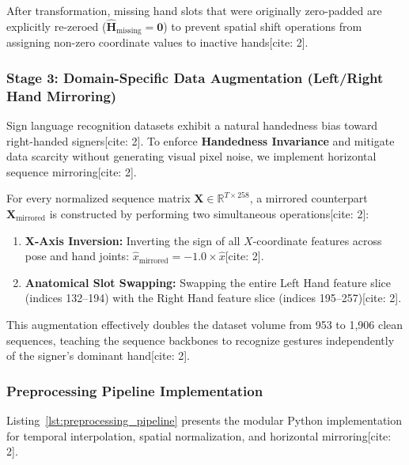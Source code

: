 \documentclass[12pt,a4paper]{article}
\begin{document}
After transformation, missing hand slots that were originally zero-padded are explicitly re-zeroed ($\hat{\mathbf{H}}_{\text{missing}} = \mathbf{0}$) to prevent spatial shift operations from assigning non-zero coordinate values to inactive hands[cite: 2].

\subsubsection{Stage 3: Domain-Specific Data Augmentation (Left/Right Hand Mirroring)}

Sign language recognition datasets exhibit a natural handedness bias toward right-handed signers[cite: 2]. To enforce \textbf{Handedness Invariance} and mitigate data scarcity without generating visual pixel noise, we implement horizontal sequence mirroring[cite: 2].

For every normalized sequence matrix $\mathbf{X} \in \mathbb{R}^{T \times 258}$, a mirrored counterpart $\mathbf{X}_{\text{mirrored}}$ is constructed by performing two simultaneous operations[cite: 2]:
\begin{enumerate}
    \item \textbf{X-Axis Inversion:} Inverting the sign of all $X$-coordinate features across pose and hand joints: $\hat{x}_{\text{mirrored}} = -1.0 \times \hat{x}$[cite: 2].
    \item \textbf{Anatomical Slot Swapping:} Swapping the entire Left Hand feature slice (indices 132–194) with the Right Hand feature slice (indices 195–257)[cite: 2].
\end{enumerate}

This augmentation effectively doubles the dataset volume from 953 to 1,906 clean sequences, teaching the sequence backbones to recognize gestures independently of the signer's dominant hand[cite: 2].

\subsubsection{Preprocessing Pipeline Implementation}

Listing~\ref{lst:preprocessing_pipeline} presents the modular Python implementation for temporal interpolation, spatial normalization, and horizontal mirroring[cite: 2].
\end{document}
